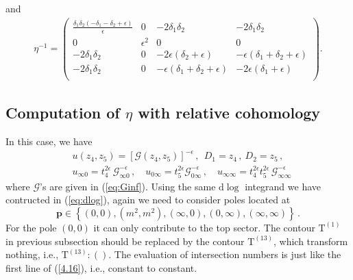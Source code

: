 \documentclass[a4paper,11pt]{article}
\newcommand{\nn}{\nonumber}
\newcommand{\nd}{\mathrm{d}}
\newcommand{\nT}{\mathrm{T}}
\newcommand{\mG}{\mathcal{G}}
\newcommand{\ep}{\epsilon}
\def\eref#1{(\ref{#1})}
\begin{document}
and
\begin{align}
\eta^{-1} = \begin{pmatrix}
	\frac{\delta _1 \delta _2 \left(-\delta _1-\delta _2+\epsilon \right)}{\epsilon } & 0 & -2 \delta _1 \delta _2 & -2 \delta _1 \delta _2 \\
	0 & \epsilon ^2 & 0 & 0 \\
	-2 \delta _1 \delta _2 & 0 & -2 \epsilon  \left(\delta _2+\epsilon \right) & -\epsilon  \left(\delta _1+\delta _2+\epsilon \right) \\
	-2 \delta _1 \delta _2 & 0 & -\epsilon  \left(\delta _1+\delta _2+\epsilon \right) & -2 \epsilon  \left(\delta _1+\epsilon \right) \\
	\end{pmatrix} . \label{eq:invetareg2}
\end{align} 



\subsection{Computation of  $\eta$ with relative cohomology}
In this case, we have
\begin{align}
& u(z_4,z_5) = \left[ \mG(z_4,z_5) \right]^{-\epsilon} \,, \ \ D_1=z_4\, , \ D_2=z_5 \, ,  \nn\\
&u_{\infty 0}=t_4^{2\epsilon} \, \mG_{\infty 0}^{-\epsilon} \, , \quad u_{0 \infty}= t_5^{2\epsilon}\mG_{0\infty }^{-\epsilon} \, , \quad  u_{\infty \infty}=t_4^{2\epsilon} t_5^{2\ep} \, \mG_{\infty \infty}^{-\epsilon} 
\end{align}
where $\mG$'s are given in  \eref{eq:Ginf}.
Using the same $\nd \log$ integrand we have contructed in \eref{eq:dlog}, again we need to consider poles located at 
\begin{equation}
    \bm{p} \in \left\{ (0,0), (m^2,m^2), (\infty,0), (0,\infty), (\infty,\infty) \right\} \,.
\end{equation}
For the pole $(0,0)$ it can only contribute to the top sector. The contour $\nT^{(1)}$ in previous subsection should be replaced by the contour $\nT^{(13)}$, which transform nothing, i.e., $\nT^{(13)} : ()$. The evaluation 
of intersection numbers is just like the first line of  \eref{4.16}, i.e., constant to constant. 
\end{document}
